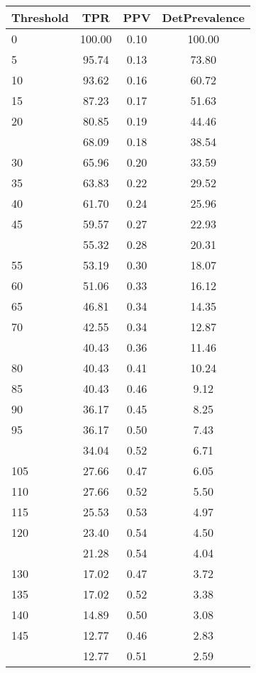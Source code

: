 \begin{table}[ht]
\centering
\begin{tabular}{lccc}
  \toprule
Threshold & TPR & PPV & DetPrevalence \\ 
  \midrule
0 & 100.00 & 0.10 & 100.00 \\ 
  5 & 95.74 & 0.13 & 73.80 \\ 
  10 & 93.62 & 0.16 & 60.72 \\ 
  15 & 87.23 & 0.17 & 51.63 \\ 
  20 & 80.85 & 0.19 & 44.46 \\ 
   \addlinespace
25 & 68.09 & 0.18 & 38.54 \\ 
  30 & 65.96 & 0.20 & 33.59 \\ 
  35 & 63.83 & 0.22 & 29.52 \\ 
  40 & 61.70 & 0.24 & 25.96 \\ 
  45 & 59.57 & 0.27 & 22.93 \\ 
   \addlinespace
50 & 55.32 & 0.28 & 20.31 \\ 
  55 & 53.19 & 0.30 & 18.07 \\ 
  60 & 51.06 & 0.33 & 16.12 \\ 
  65 & 46.81 & 0.34 & 14.35 \\ 
  70 & 42.55 & 0.34 & 12.87 \\ 
   \addlinespace
75 & 40.43 & 0.36 & 11.46 \\ 
  80 & 40.43 & 0.41 & 10.24 \\ 
  85 & 40.43 & 0.46 & 9.12 \\ 
  90 & 36.17 & 0.45 & 8.25 \\ 
  95 & 36.17 & 0.50 & 7.43 \\ 
   \addlinespace
100 & 34.04 & 0.52 & 6.71 \\ 
  105 & 27.66 & 0.47 & 6.05 \\ 
  110 & 27.66 & 0.52 & 5.50 \\ 
  115 & 25.53 & 0.53 & 4.97 \\ 
  120 & 23.40 & 0.54 & 4.50 \\ 
   \addlinespace
125 & 21.28 & 0.54 & 4.04 \\ 
  130 & 17.02 & 0.47 & 3.72 \\ 
  135 & 17.02 & 0.52 & 3.38 \\ 
  140 & 14.89 & 0.50 & 3.08 \\ 
  145 & 12.77 & 0.46 & 2.83 \\ 
   \addlinespace
150 & 12.77 & 0.51 & 2.59 \\ 

\end{tabular}
\end{table}
